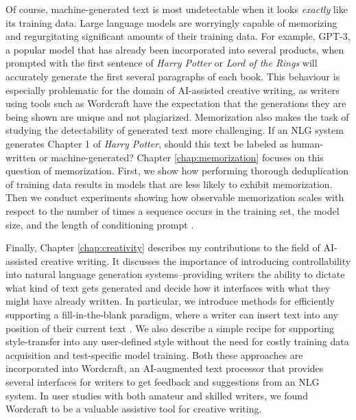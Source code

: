 Of course, machine-generated text is most undetectable when it looks \textit{exactly} like its training data.
Large language models are worryingly capable of memorizing and regurgitating significant amounts of their training data.
For example, GPT-3, a popular model that has already been incorporated into several products, when prompted with the first sentence of \textit{Harry Potter} or \textit{Lord of the Rings} will accurately generate the first several paragraphs of each book.
This behaviour is especially problematic for the domain of AI-assisted creative writing, as writers using tools such as Wordcraft have the expectation that the generations they are being shown are unique and not plagiarized.
Memorization also makes the task of studying the detectability of generated text more challenging.
If an NLG system generates Chapter 1 of \textit{Harry Potter}, should this text be labeled as human-written or machine-generated?
Chapter \ref{chap:memorization} focuses on this question of memorization.
First, we show how performing thorough deduplication of training data results in models that are less likely to exhibit memorization.
Then we conduct experiments showing how observable memorization scales with respect to the number of times a sequence occurs in the training set, the model size, and the length of conditioning prompt \citep{carlini2022quantifying}.

Finally, Chapter \ref{chap:creativity} describes my contributions to the field of AI-assisted creative writing. 
It discusses the importance of introducing controllability into natural language generation systems--providing writers the ability to dictate what kind of text gets generated and decide how it interfaces with what they might have already written.
In particular, we introduce methods for efficiently supporting a fill-in-the-blank paradigm, where a writer can insert text into any position of their current text \citep{fitb_fite}.
We also describe a simple recipe for supporting style-transfer into any user-defined style without the need for costly training data acquisition and test-specific model training.
Both these approaches are incorporated into Wordcraft, an AI-augmented text processor that provides several interfaces for writers to get feedback and suggestions from an NLG system.
In user studies with both amateur and skilled writers, we found Wordcraft to be a valuable assistive tool for creative writing.





